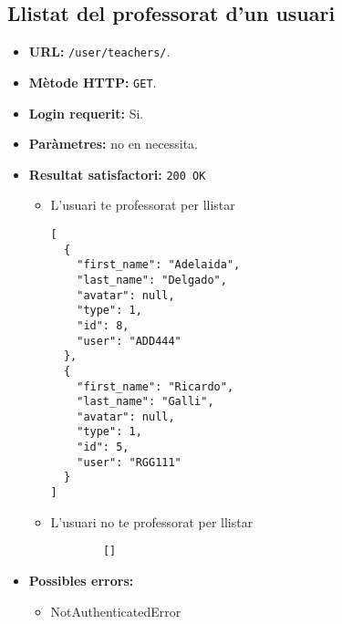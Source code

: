 \subsection{Llistat del professorat d'un usuari}
\begin{itemize}
\item \textbf{\ac{URL}: } \texttt{/user/teachers/}.
\item \textbf{Mètode \ac{HTTP}: } \texttt{GET}.
\item \textbf{Login requerit:} Si.
\item \textbf{Paràmetres:} no en necessita.
	
\item \textbf{Resultat satisfactori:} \texttt{200 OK}
	\begin{itemize}
		\item L'usuari te professorat per llistar
		\begin{verbatim}
[
  {
    "first_name": "Adelaida",
    "last_name": "Delgado",
    "avatar": null,
    "type": 1,
    "id": 8,
    "user": "ADD444"
  },
  {
    "first_name": "Ricardo",
    "last_name": "Galli",
    "avatar": null,
    "type": 1,
    "id": 5,
    "user": "RGG111"
  }
]
		\end{verbatim}
		\item L'usuari no te professorat per llistar
		\begin{verbatim}
		[]
		\end{verbatim}
	\end{itemize}
\item \textbf{Possibles errors:}
	\begin{itemize}
		\item NotAuthenticatedError
	\end{itemize}
\end{itemize}
